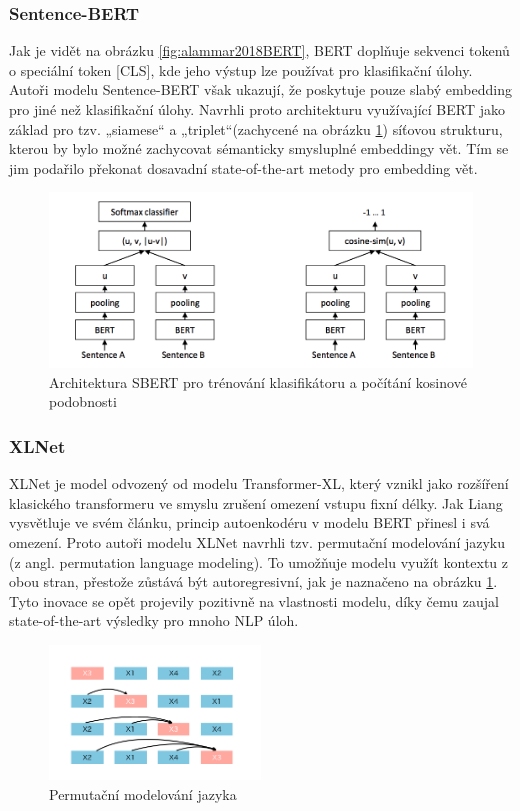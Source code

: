 \documentclass[thesis=M,czech]{FITthesis}[2019/12/23]
\begin{document}
\subsubsection*{Sentence-BERT}
Jak je vidět na obrázku \ref{fig:alammar2018BERT}, BERT doplňuje sekvenci tokenů o speciální token [CLS], kde jeho výstup lze používat pro klasifikační úlohy. Autoři modelu Sentence-BERT však ukazují\cite{reimers2019}, že poskytuje pouze slabý embedding pro jiné než klasifikační úlohy. Navrhli proto architekturu využívající BERT jako základ pro tzv. „siamese“ a „triplet“(zachycené na obrázku  \ref{fig:palachy2019SBERT}) síťovou strukturu, kterou by bylo možné zachycovat sémanticky smysluplné embeddingy vět. Tím se jim podařilo překonat dosavadní state-of-the-art metody pro embedding vět.
\begin{figure}\centering
	\includegraphics[width=\textwidth]{images/palachy2019/palachy2019_SBERT.png}
	\caption{Architektura SBERT pro trénování klasifikátoru a počítání kosinové podobnosti\cite{palachy2019}}\label{fig:palachy2019SBERT}
\end{figure}

\subsubsection*{XLNet}
XLNet\cite{yang2019} je model odvozený od modelu Transformer-XL\cite{dai2019}, který vznikl jako rozšíření klasického transformeru ve smyslu zrušení omezení vstupu fixní délky. Jak Liang vysvětluje ve svém článku\cite{liang2019}, princip autoenkodéru v modelu BERT přinesl i svá omezení. Proto autoři modelu XLNet navrhli tzv. permutační modelování jazyku (z angl. permutation language modeling). To umožňuje modelu využít kontextu z obou stran, přestože zůstává být autoregresivní, jak je naznačeno na obrázku \ref{fig:palachy2019SBERT}. Tyto inovace se opět projevily pozitivně na vlastnosti modelu, díky čemu zaujal state-of-the-art výsledky pro mnoho NLP úloh.
\begin{figure}\centering
	\includegraphics[width=0.5\textwidth]{images/liang2019/liang2019_XLNet.png}
	\caption{Permutační modelování jazyka\cite{liang2019}}\label{fig:liang2019XLNet}
\end{figure}
\end{document}
